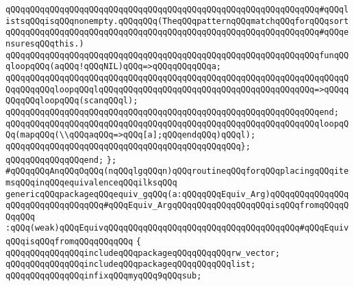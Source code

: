 \verb|qQQqqQQqqQQqqQQqqQQqqQQqqQQqqQQqqQQqqQQqqQQqqQQqqQQqqQQqqQQqqQQq#qQQqlistsqQQqisqQQqnonempty.qQQqqQQq(TheqQQqpatternqQQqmatchqQQqforqQQqsort|\newline
\verb|qQQqqQQqqQQqqQQqqQQqqQQqqQQqqQQqqQQqqQQqqQQqqQQqqQQqqQQqqQQqqQQq#qQQqensuresqQQqthis.)|\newline
\newline
\verb|qQQqqQQqqQQqqQQqqQQqqQQqqQQqqQQqqQQqqQQqqQQqqQQqqQQqqQQqqQQqqQQqfunqQQqloopqQQq(aqQQq!qQQqNIL)qQQq=>qQQqqQQqqQQqa;|\newline
\verb|qQQqqQQqqQQqqQQqqQQqqQQqqQQqqQQqqQQqqQQqqQQqqQQqqQQqqQQqqQQqqQQqqQQqqQQqqQQqqQQqloopqQQqlqQQqqQQqqQQqqQQqqQQqqQQqqQQqqQQqqQQqqQQqqQQq=>qQQqqQQqqQQqloopqQQq(scanqQQql);|\newline
\verb|qQQqqQQqqQQqqQQqqQQqqQQqqQQqqQQqqQQqqQQqqQQqqQQqqQQqqQQqqQQqqQQqend;|\newline
\newline
\verb|qQQqqQQqqQQqqQQqqQQqqQQqqQQqqQQqqQQqqQQqqQQqqQQqqQQqqQQqqQQqqQQqloopqQQq(mapqQQq(\\qQQqaqQQq=>qQQq[a];qQQqendqQQq)qQQql);|\newline
\verb|qQQqqQQqqQQqqQQqqQQqqQQqqQQqqQQqqQQqqQQqqQQqqQQq};|\newline
\verb|qQQqqQQqqQQqqQQqend;|\newline
\verb|};|\newline
\newline
\verb|#qQQqqQQqAnqQQqOqQQq(nqQQqlgqQQqn)qQQqroutineqQQqforqQQqplacingqQQqitemsqQQqinqQQqequivalenceqQQqilksqQQq|\newline
\newline
\verb|genericqQQqpackageqQQqequiv_gqQQq(a:qQQqqQQqEquiv_Arg)qQQqqQQqqQQqqQQqqQQqqQQqqQQqqQQqqQQq#qQQqEquiv_ArgqQQqqQQqqQQqqQQqqQQqisqQQqfromqQQqqQQqqQQq|\newline
\newline
\verb|:qQQq(weak)qQQqEquivqQQqqQQqqQQqqQQqqQQqqQQqqQQqqQQqqQQqqQQq#qQQqEquivqQQqisqQQqfromqQQqqQQqqQQq|\newline
\newline
\verb|{|\newline
\verb|qQQqqQQqqQQqqQQqincludeqQQqpackageqQQqqQQqqQQqrw_vector;|\newline
\verb|qQQqqQQqqQQqqQQqincludeqQQqpackageqQQqqQQqqQQqlist;|\newline
\newline
\verb|qQQqqQQqqQQqqQQqinfixqQQqmyqQQq9qQQqsub;|\newline
